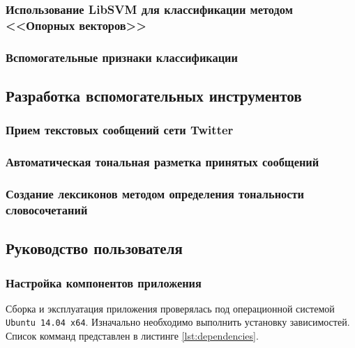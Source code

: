         \subsubsection{Использование LibSVM для классификации методом <<Опорных векторов>>}

        \subsubsection{Вспомогательные признаки классификации}

    \subsection{Разработка вспомогательных инструментов}
        \subsubsection{Прием текстовых сообщений сети Twitter}

        \subsubsection{Автоматическая тональная разметка принятых сообщений}

        \subsubsection{Создание лексиконов методом определения тональности словосочетаний}

    \subsection{Руководство пользователя}
        \subsubsection{Настройка компонентов приложения}
        Сборка и эксплуатация приложения проверялась под операционной системой
        {\tt Ubuntu 14.04 x64}. Изначально необходимо выполнить установку зависимостей.
        Список комманд представлен в листинге \ref{lst:dependencies}.
        \lstset{style=bash}
        

